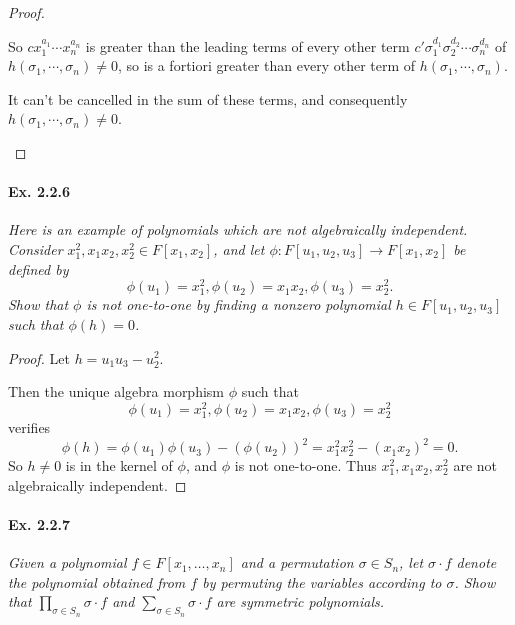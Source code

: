 \documentclass[11pt,a4paper]{article}
\begin{document}
\begin{proof}
\begin{enumerate}
So $cx_1^{a_1}\cdots x_n^{a_n}$ is greater than the leading terms of every other term $c'\sigma_1^{d_1}\sigma_2^{d_2}\cdots \sigma_n^{d_n}$ of $h(\sigma_1,\cdots,\sigma_n) \neq 0$, so is a fortiori greater than every other term of $h(\sigma_1,\cdots,\sigma_n)$.

 It can't be cancelled in the sum of these terms, and consequently $h(\sigma_1,\cdots,\sigma_n) \neq 0$.
\end{enumerate}
\end{proof}

\paragraph{Ex. 2.2.6}

{\it Here is an example of polynomials which are not algebraically independent. Consider $x_1^2,x_1x_2,x_2^2 \in F[x_1,x_2]$, and let $\phi : F[u_1,u_2,u_3] \to F[x_1,x_2]$ be defined by
$$\phi(u_1) = x_1^2,\phi(u_2)= x_1x_2, \phi(u_3) = x_2^2.$$
Show that $\phi$ is not one-to-one by finding a nonzero polynomial $h \in F[u_1,u_2,u_3]$ such that $\phi(h)=0$.
}

\begin{proof}
Let $h = u_1u_3 -u_2^2$.

Then the unique algebra morphism $\phi$ such that 
$$\phi(u_1) = x_1^2, \phi(u_2) = x_1x_2, \phi(u_3) = x_2^2$$
verifies
$$\phi(h) = \phi(u_1)\phi(u_3) - (\phi(u_2))^2 = x_1^2 x_2^2 - (x_1x_2)^2 = 0.$$
So $h \neq 0$ is in the kernel of $\phi$, and $\phi$ is not one-to-one. Thus $x_1^2,x_1x_2,x_2^2$ are not algebraically independent.
\end{proof}

\paragraph{Ex. 2.2.7}

{\it Given a polynomial $f \in F[x_1,\ldots,x_n]$ and a permutation $\sigma \in S_n$, let $\sigma \cdot f$ denote the polynomial obtained from $f$ by permuting the variables according to $\sigma$. Show that $\prod_{\sigma \in S_n} \sigma \cdot f$ and $\sum_{\sigma \in S_n} \sigma \cdot f$ are symmetric polynomials.
}
\end{document}
